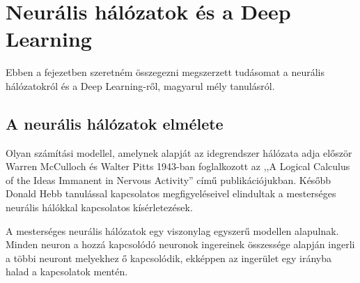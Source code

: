 \chapter{Neurális hálózatok és a Deep Learning}
Ebben a fejezetben szeretném összegezni megszerzett tudásomat a neurális hálózatokról és a Deep Learning-ről, magyarul mély tanulásról. 
\section{A neurális hálózatok elmélete}
\label{section:neuralNetworkTheory}
Olyan számítási modellel, amelynek alapját az idegrendszer hálózata adja először  Warren McCulloch és Walter Pitts 1943-ban foglalkozott az ,,A Logical Calculus of the Ideas Immanent in Nervous Activity'' című publikációjukban. Később Donald Hebb tanulással kapcsolatos megfigyeléseivel elindultak a mesterséges neurális hálókkal kapcsolatos kísérletezések.\cite{neural2006}

A mesterséges neurális hálózatok egy viszonylag egyszerű modellen alapulnak. Minden neuron a hozzá kapcsolódó neuronok ingereinek összessége alapján ingerli a többi neuront melyekhez ő kapcsolódik, ekképpen az ingerület egy irányba halad a kapcsolatok mentén.

